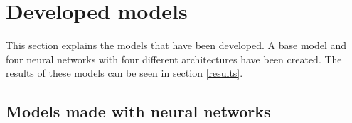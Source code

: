 \section{Developed models}

This section explains the models that have been developed. A base model and four neural networks with four different architectures have been created. The results of these models can be seen in section \ref{results}.
\newline


\subsection{Models made with neural networks}





